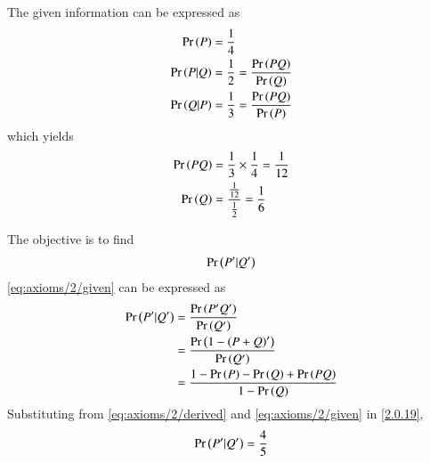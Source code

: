 The given information can be expressed as
\begin{align}
    \label{eq:axioms/2/given}
    \Pr\left(P\right) &= \frac{1}{4} \\
    \Pr\left(P|Q\right) &= \frac{1}{2}  = \frac{\Pr\left(PQ\right)}{\Pr\left(Q\right)}\\
    \Pr\left(Q|P\right) &= \frac{1}{3}  =  \frac{\Pr\left(PQ\right)}{\Pr\left(P\right)}
    \end{align}
    which yields
    \begin{align}
        \label{eq:axioms/2/derived}
        \begin{split}
        \Pr\left(PQ\right) &= \frac{1}{3} \times \frac{1}{4}  = \frac{1}{12}
        \\
        \Pr\left(Q\right) &= \frac{\frac{1}{12}}{\frac{1}{2}} = \frac{1}{6}
        \end{split}
        \end{align}
    
The objective is to find
\begin{align}
    \Pr\left(P^{\prime}|Q^{\prime}\right)
    \label{eq:axioms/2/tofind}
\end{align}
\eqref{eq:axioms/2/given} can be expressed as 
\begin{align}
    \Pr\left(P^{\prime}|Q^{\prime}\right) &= \frac{\Pr\left(P^{\prime}Q^{\prime}\right)}{\Pr\left(Q^{\prime}\right)} 
\\
&= \frac{\Pr\left(1 - \left(P + Q\right)^{\prime}\right)}{\Pr\left(Q^{\prime}\right)} 
\\
&= \frac{1 - \Pr\left(P\right)-\Pr\left(Q\right) +\Pr\left(PQ\right)}{1 - \Pr\left(Q\right)} 
   \label{2.0.19}   
    \end{align}
Substituting from     \eqref{eq:axioms/2/derived} and     \eqref{eq:axioms/2/given} in    \eqref{2.0.19},   
\begin{align}
    \Pr\left(P^{\prime}|Q^{\prime}\right) = \frac{4}{5}
\end{align}

